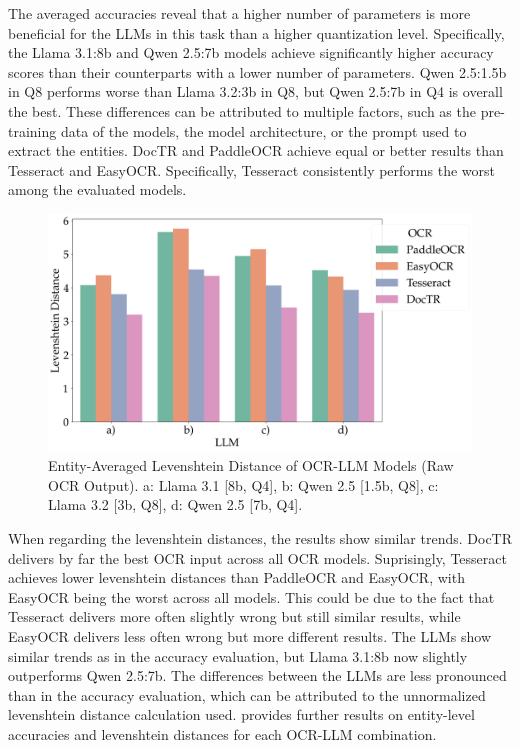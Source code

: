 \documentclass[11pt]{article}
\begin{document}
The averaged accuracies reveal that a higher number of parameters is more beneficial for the LLMs in this task than a higher quantization level. Specifically, the Llama 3.1:8b and Qwen 2.5:7b models achieve significantly higher accuracy scores than their counterparts with a lower number of parameters. Qwen 2.5:1.5b in Q8 performs worse than Llama 3.2:3b in Q8, but Qwen 2.5:7b in Q4 is overall the best. These differences can be attributed to multiple factors, such as the pre-training data of the models, the model architecture, or the prompt used to extract the entities. DocTR and PaddleOCR achieve equal or better results than Tesseract and EasyOCR. Specifically, Tesseract consistently performs the worst among the evaluated models.

\begin{figure}[h!]
    \centering
    \includegraphics[width=0.8\linewidth]{figures/avg_levdistances.png}
    \caption{Entity-Averaged Levenshtein Distance of OCR-LLM Models (Raw OCR Output). a: Llama 3.1 [8b, Q4], b: Qwen 2.5 [1.5b, Q8], c: Llama 3.2 [3b, Q8], d: Qwen 2.5 [7b, Q4].}
    \label{fig:eval_ocr_llm_levdist_avg}
\end{figure}

When regarding the levenshtein distances, the results show similar trends. DocTR delivers by far the best OCR input across all OCR models. Suprisingly, Tesseract achieves lower levenshtein distances than PaddleOCR and EasyOCR, with EasyOCR being the worst across all models. This could be due to the fact that Tesseract delivers more often slightly wrong but still similar results, while EasyOCR delivers less often wrong but more different results. The LLMs show similar trends as in the accuracy evaluation, but Llama 3.1:8b now slightly outperforms Qwen 2.5:7b. The differences between the LLMs are less pronounced than in the accuracy evaluation, which can be attributed to the unnormalized levenshtein distance calculation used.  provides further results on entity-level accuracies and levenshtein distances for each OCR-LLM combination.
\end{document}
